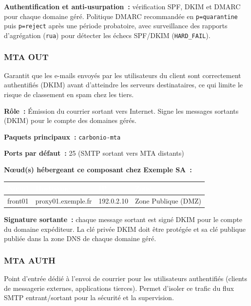 \documentclass[11pt,a4paper]{report}
\newcommand{\tblhead}[1]{\textcolor{white}{\textbf{#1}}}
\begin{document}
\textbf{Authentification et anti-usurpation~:} vérification SPF, DKIM et DMARC pour chaque domaine géré. Politique DMARC recommandée en \texttt{p=quarantine} puis \texttt{p=reject} après une période probatoire, avec surveillance des rapports d'agrégation (\texttt{rua}) pour détecter les échecs SPF/DKIM (\texttt{HARD\_FAIL}).



\subsubsection{MTA OUT}

Garantit que les e-\allowbreak{}mails envoyés par les utilisateurs du client sont correctement authentifiés (DKIM) avant d'atteindre les serveurs destinataires, ce qui limite le risque de classement en spam chez les tiers.\allowbreak{}

\textbf{Rôle~:} Émission du courrier sortant vers Internet.\allowbreak{} Signe les messages sortants (DKIM) pour le compte des domaines gérés.\allowbreak{}


\textbf{Paquets principaux~:} \texttt{carbonio-\allowbreak{}mta}

\textbf{Ports par défaut~:} 25 (SMTP sortant vers MTA distants)

\textbf{Nœud(s) hébergeant ce composant chez Exemple SA~:}
\begin{longtable}{|p{3.2cm}|p{4.5cm}|p{3.2cm}|p{2.3cm}|}
\hline
\rowcolor{primary}\tblhead{Nœud} & \tblhead{Hostname} & \tblhead{IP} & \tblhead{Zone} \\
\hline
\endhead
front01 & proxy01.\allowbreak{}exemple.\allowbreak{}fr & 192.\allowbreak{}0.\allowbreak{}2.\allowbreak{}10 & Zone Publique (DMZ) \\
\hline
\end{longtable}

\textbf{Signature sortante~:} chaque message sortant est signé DKIM pour le compte du domaine expéditeur. La clé privée DKIM doit être protégée et sa clé publique publiée dans la zone DNS de chaque domaine géré.



\subsubsection{MTA AUTH}

Point d'entrée dédié à l'envoi de courrier pour les utilisateurs authentifiés (clients de messagerie externes, applications tierces).\allowbreak{} Permet d'isoler ce trafic du flux SMTP entrant/sortant pour la sécurité et la supervision.\allowbreak{}
\end{document}
